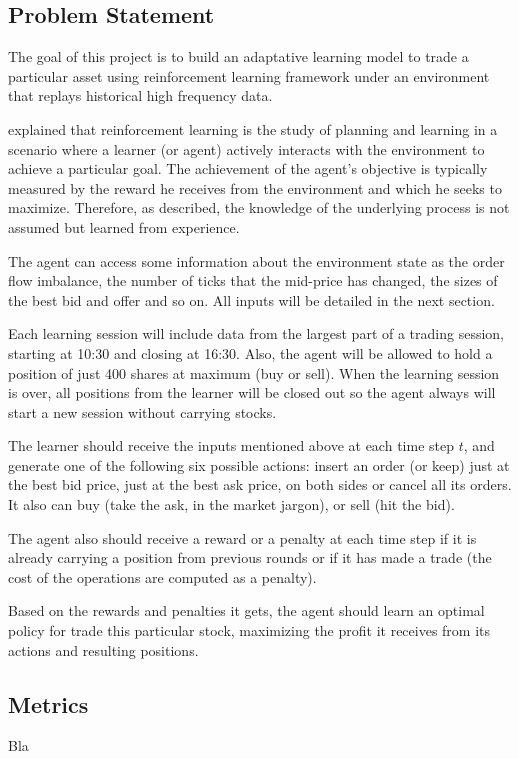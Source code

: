 \documentclass[a4paper]{article}
\begin{document}
\subsection{Problem Statement}
The goal of this project is to build an adaptative learning model to trade a particular asset using reinforcement learning framework under an environment that replays historical high frequency data.

\cite{Mohri_2012} explained that reinforcement learning is the study of planning and learning in a scenario where a learner (or agent) actively interacts with the environment to achieve a particular goal. The achievement of the agent's objective is typically measured by the reward he receives from the environment and which he seeks to maximize. Therefore, as \cite{chan2001electronic} described, the knowledge of the underlying process is not assumed but learned from experience.

The agent can access some information about the environment state as the order flow imbalance, the number of ticks that the mid-price has changed, the sizes of the best bid and offer and so on. All inputs will be detailed in the next section.

Each learning session will include data from the largest part of a trading session, starting at 10:30 and closing at 16:30. Also, the agent will be allowed to hold a position of just 400 shares at maximum (buy or sell). When the learning session is over, all positions from the learner will be closed out so the agent always will start a new session without carrying stocks.

The learner should receive the inputs mentioned above at each time step $t$, and generate one of the following six possible actions: insert an order (or keep) just at the best bid price, just at the best ask price, on both sides or cancel all its orders. It also can buy (take the ask, in the market jargon), or sell (hit the bid).

The agent also should receive a reward or a penalty at each time step if it is already carrying a position from previous rounds or if it has made a trade (the cost of the operations are computed as a penalty).

Based on the rewards and penalties it gets, the agent should learn an optimal policy for trade this particular stock, maximizing the profit it receives from its actions and resulting positions.

\subsection{Metrics}
Bla
\end{document}
